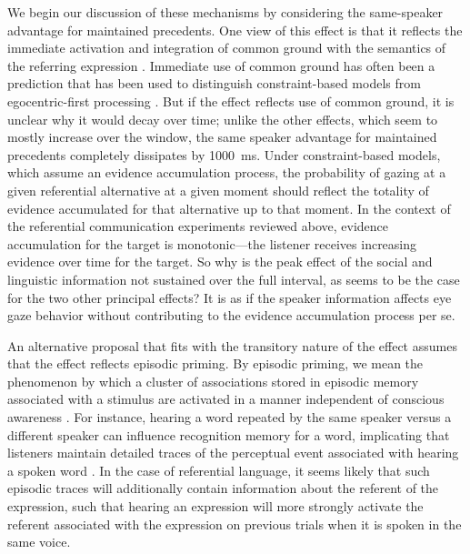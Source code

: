 \documentclass[doc,fignum,apacite,floatsintext]{apa6}
\begin{document}
We begin our discussion of these mechanisms by considering the same-speaker advantage for maintained precedents.  One view of this effect is that it reflects the immediate activation and integration of common ground with the semantics of the referring expression \cite{brownschmidt09}.  Immediate use of common ground has often been a prediction that has been used to distinguish constraint-based models from egocentric-first processing \cite{hannaetal03,nadigsedivy02}.  But if the effect reflects use of common ground, it is unclear why it would decay over time; unlike the other effects, which seem to mostly increase over the window, the same speaker advantage for maintained precedents completely dissipates by 1000~ms.  Under constraint-based models, which assume an evidence accumulation process, the probability of gazing at a given referential alternative at a given moment should reflect the totality of evidence accumulated for that alternative up to that moment.  In the context of the referential communication experiments reviewed above, evidence accumulation for the target is monotonic---the listener receives increasing evidence over time for the target.  So why is the peak effect of the social and linguistic information not sustained over the full interval, as seems to be the case for the two other principal effects?  It is as if the speaker information affects eye gaze behavior without contributing to the evidence accumulation process per se.

An alternative proposal that fits with the transitory nature of the effect assumes that the effect reflects episodic priming.  By episodic priming, we mean the phenomenon by which a cluster of associations stored in episodic memory associated with a stimulus are activated in a manner independent of conscious awareness \cite{TulvingSchacter1990}.  For instance, hearing a word repeated by the same speaker versus a different speaker can influence recognition memory for a word, implicating that listeners maintain detailed traces of the perceptual event associated with hearing a spoken word \cite{churchschacter94,goldinger96,mullennixpisonimartin89}.  In the case of referential language, it seems likely that such episodic traces will additionally contain information about the referent of the expression, such that hearing an expression will more strongly activate the referent associated with the expression on previous trials when it is spoken in the same voice.
\end{document}
